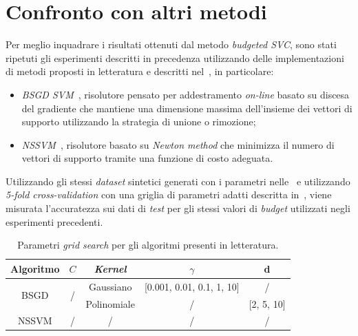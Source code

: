 \section{Confronto con altri metodi}\label{sec:comparazione_metodi}
Per meglio inquadrare i risultati ottenuti dal metodo \emph{budgeted SVC}, sono stati ripetuti gli esperimenti descritti in precedenza utilizzando delle implementazioni di metodi proposti in letteratura e descritti nel~, in particolare:
\begin{itemize}
    \item \emph{BSGD SVM}~\cite{2012_bsgd}, risolutore pensato per addestramento \emph{on-line} basato su discesa del gradiente che mantiene una dimensione massima dell'insieme dei vettori di supporto utilizzando la strategia di unione o rimozione;
    \item \emph{NSSVM}~\cite{2020_sparse_svm}, risolutore basato su \emph{Newton method} che minimizza il numero di vettori di supporto tramite una funzione di costo adeguata.
\end{itemize}
Utilizzando gli stessi \emph{dataset} sintetici generati con i parametri nelle~ e utilizzando \emph{5-fold cross-validation} con una griglia di parametri adatti descritta in~, viene misurata l'accuratezza sui dati di \emph{test} per gli stessi valori di \emph{budget} utilizzati negli esperimenti precedenti.
\begin{table}
    \centering
    \begin{tabular}{ccccc}
        \toprule
        Algoritmo & $C$ & \emph{Kernel} & $\gamma$ & d \\
        \midrule
        \multirow{2}{*}{BSGD}   & \multirow{2}{*}{/}  & Gaussiano   & [0.001, 0.01, 0.1, 1, 10]   & /\\
                                      \cline{3-5}
                                &   & Polinomiale & / & [2, 5, 10] \\
        \hline
        NSSVM   & / & / & / & / \\
        \bottomrule
    \end{tabular}
    \caption{Parametri \emph{grid search} per gli algoritmi presenti in letteratura.}
    \label{tab:gridsearch_comparazioni}
\end{table}
